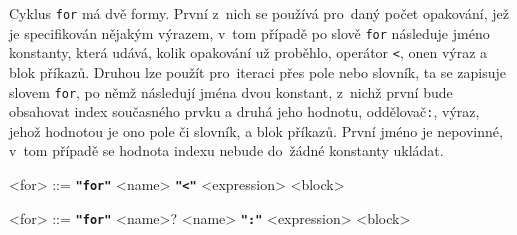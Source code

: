\documentclass[a4paper,12pt]{article}
\def\quote #1{"#1"}
\def\emphasis #1{\textbf{\texttt{\quote{#1}}}}
\begin{document}
Cyklus \texttt{for} má dvě formy. První z~nich se používá pro~daný počet opakování, jež je specifikován nějakým výrazem, v~tom případě po slově \texttt{for} následuje jméno konstanty, která udává, kolik opakování už proběhlo, operátor \texttt{\textless}, onen výraz a blok příkazů. Druhou lze použít pro~iteraci přes pole nebo slovník, ta se zapisuje slovem \texttt{for}, po němž následují jména dvou konstant, z~nichž první bude obsahovat index současného prvku a druhá jeho hodnotu, oddělovač\texttt{:}, výraz, jehož hodnotou je ono pole či slovník, a blok příkazů. První jméno je nepovinné, v~tom případě se hodnota indexu nebude do~žádné konstanty ukládat.
\begin{grammar}
<for> ::= \emphasis{for} <name> \emphasis{\textless} <expression> <block>

<for> ::= \emphasis{for} <name>? <name> \emphasis{:} <expression> <block>
\end{grammar}
\end{document}
